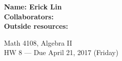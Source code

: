 \documentclass[12pt]{article}
\begin{document}
\noindent
\textbf{Name: Erick Lin} \smallskip  \\
\textbf{Collaborators:} \smallskip \\ %
\textbf{Outside resources:} \smallskip \\ %

\begin{center}
{
Math 4108, Algebra II \\
HW 8 --- Due April 21, 2017 (Friday)
}
\end{center}

\iffalse
Do the following problems from Lang:\\
V\S6, 1, 2.\\
V\S7, 2, 3, 4.\\
V\S8, 1, 6, 7.\\
V\S9, 1, 4, 6, 8, 9, 25.
\fi
\end{document}
